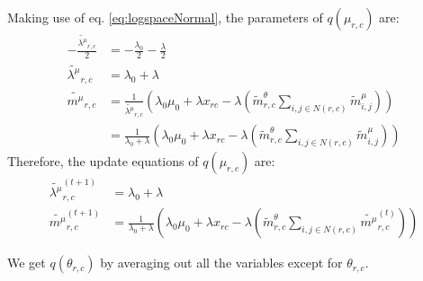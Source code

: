 \documentclass[12pt]{article}
\newenvironment{problem}[2][Problem]{\begin{trivlist}
\item[\hskip \labelsep {\bfseries #1}\hskip \labelsep {\bfseries #2.}]}{\end{trivlist}}
\begin{document}
\begin{problem}{2.9.25}
Making use of eq. \eqref{eq:logspaceNormal}, the parameters of $q(\mu_{r,c})$ are:
\begin{align*}
    -\frac{\tilde{\lambda^{\mu}}_{r,c}}{2} &= -\frac{\lambda_0}{2} -\frac{\lambda}{2} \\
    \tilde{\lambda^{\mu}}_{r,c} &= \lambda_0 + \lambda \\
    \tilde{m^{\mu}}_{r,c} &= 
    \frac{1}{\tilde{\lambda^{\mu}}_{r,c}}
    (\lambda_0\mu_0 + \lambda x_{rc} -\lambda(\tilde{m}^{\theta}_{r,c}\sum_{i,j \in N(r,c)}\tilde{m}^{\mu}_{i,j})) \\
    &= \frac{1}{\lambda_0 + \lambda}
    (\lambda_0\mu_0 + \lambda x_{rc} -\lambda(\tilde{m}^{\theta}_{r,c}\sum_{i,j \in N(r,c)}\tilde{m}^{\mu}_{i,j}))
\end{align*}
Therefore, the update equations of $q(\mu_{r,c})$ are:
\begin{align}
    \tilde{\lambda^{\mu}}_{r,c}^{(t+1)} &= \lambda_0 + \lambda \\
    \tilde{m^{\mu}}_{r,c}^{(t+1)}  &= \frac{1}{\lambda_0 + \lambda}
    (\lambda_0\mu_0 + \lambda x_{rc} -\lambda(\tilde{m}^{\theta}_{r,c}\sum_{i,j \in N(r,c)}\tilde{m^{\mu}}_{r,c}^{(t)}))
\end{align}

We get $q(\theta_{r,c})$ by averaging out all the variables except for $\theta_{r,c}$.


\end{problem}
\end{document}
